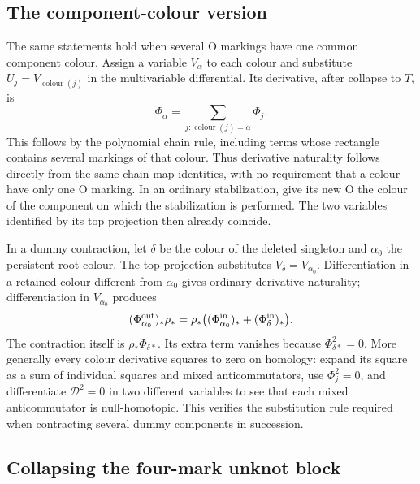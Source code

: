 \documentclass[11pt,a4paper]{article}
\theoremstyle{remark}
\begin{document}
\subsection{The component-colour version}

The same statements hold when several O markings have one common
component colour.  Assign a variable $V_\alpha$ to each colour and
substitute $U_j=V_{\operatorname{colour}(j)}$ in the multivariable
differential.  Its derivative, after collapse to $T$, is
\[
 \Phi_\alpha=\sum_{j:\operatorname{colour}(j)=\alpha}\Phi_j.
\]
This follows by the polynomial chain rule, including terms whose
rectangle contains several markings of that colour.  Thus derivative
naturality follows directly from the same chain-map identities, with no
requirement that a colour have only one O marking.  In an ordinary
stabilization, give its new O the colour of the component on which the
stabilization is performed.  The two variables identified by its top
projection then already coincide.

In a dummy contraction, let $\delta$ be the colour of the deleted
singleton and $\alpha_0$ the persistent root colour.  The top projection
substitutes $V_\delta=V_{\alpha_0}$.  Differentiation in a retained colour
different from $\alpha_0$ gives ordinary derivative naturality;
differentiation in $V_{\alpha_0}$ produces
\[
 (\Phi_{\alpha_0}^{\rm out})_*\rho_*
 =\rho_*\bigl((\Phi_{\alpha_0}^{\rm in})_*
                    +(\Phi_\delta^{\rm in})_*\bigr).
\]
The contraction itself is $\rho_*\Phi_{\delta*}$.  Its extra term
vanishes because $\Phi_{\delta*}^2=0$.  More generally every colour
derivative squares to zero on homology: expand its square as a sum of
individual squares and mixed anticommutators, use $\Phi_j^2=0$, and
differentiate $\mathcal D^2=0$ in two different variables to see that
each mixed anticommutator is null-homotopic.  This verifies the
substitution rule required when contracting several dummy components
in succession.

\subsection{Collapsing the four-mark unknot block}
\end{document}
